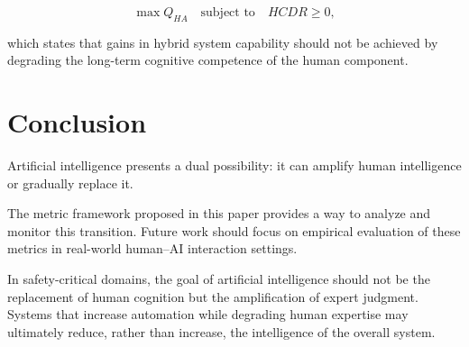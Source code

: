 \documentclass[11pt]{article}
\begin{document}
\[
\max Q_{HA}
\quad \text{subject to} \quad
HCDR \ge 0,
\]

which states that gains in hybrid system capability should not be
achieved by degrading the long-term cognitive competence of the
human component.

\section{Conclusion}

Artificial intelligence presents a dual possibility:
it can amplify human intelligence or gradually replace it.

The metric framework proposed in this paper provides a way to
analyze and monitor this transition.
Future work should focus on empirical evaluation
of these metrics in real-world human--AI interaction settings.

In safety-critical domains, the goal of artificial intelligence
should not be the replacement of human cognition but the
amplification of expert judgment.
Systems that increase automation while degrading human expertise
may ultimately reduce, rather than increase, the intelligence of
the overall system.



\end{document}
